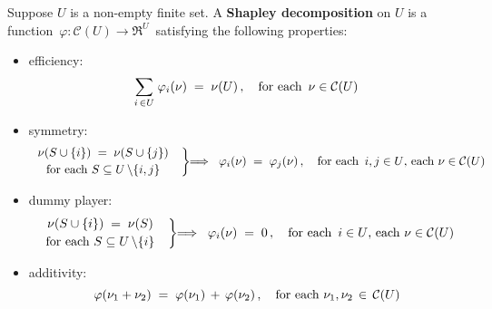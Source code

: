 \begin{definition}
\label{definition:ShapleyDecomposition}
\mbox{}
\vskip 0.1cm
\noindent
Suppose $U$ is a non-empty finite set.
A \textbf{Shapley decomposition} on $U$ is a function
\,$\varphi : \mathcal{C}(U) \longrightarrow \Re^{U}$\,
satisfying the following properties:
\begin{itemize}
\item
	efficiency:
	\begin{equation*}
	\underset{i \,\in U}{\sum}\; \varphi_{i}(\nu) \; = \; \nu(U)\,,
	\quad
	\textnormal{for each \,$\nu \in \mathcal{C}(U)$}
	\end{equation*}
\item
	symmetry:\;\;
	\begin{equation*}
		\left.\begin{array}{c}
			\nu\!\left(S\cup\{i\}\right) \; = \; \nu\!\left(S\cup\{j\}\right)
			\\
			\textnormal{for each $\overset{{\color{white}.}}{S} \subseteq U\,\backslash \{i,j\}$}
		\end{array}
		\;\;\right\}\!\!\Longrightarrow\;\;
		\varphi_{i}(\nu) \; = \; \varphi_{j}(\nu)\,,
	\quad
		\textnormal{for each \,$i,j \in U$, each $\nu \in \mathcal{C}(U)$}
	\end{equation*}
\item
	dummy player:\;\;
	\begin{equation*}
		\left.\begin{array}{c}
			\nu\!\left(S\cup\{i\}\right) \; = \; \nu\!\left(S\right)
			\\
			\textnormal{for each $\overset{{\color{white}.}}{S} \subseteq U\,\backslash \{i\}$}
		\end{array}
		\;\;\right\}\!\!\Longrightarrow\;\;
		\varphi_{i}(\nu) \; = \; 0\,,
	\quad
		\textnormal{for each \,$i \in U$, each $\nu \in \mathcal{C}(U)$}
	\end{equation*}
\item
	additivity:\;\;
	\begin{equation*}
		\varphi(\nu_{1}+\nu_{2}) \; = \; \varphi(\nu_{1}) \, + \, \varphi(\nu_{2})\,,
	\quad
		\textnormal{for each $\nu_{1}, \nu_{2} \,\in\, \mathcal{C}(U)$}
	\end{equation*}
\end{itemize}
\end{definition}

